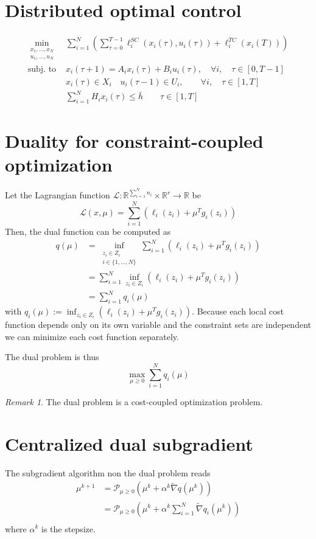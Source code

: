 \documentclass{book}
\newcommand{\R}{\mathbb{R}}
\theoremstyle{theoremv2}
\theoremstyle{defv2}
\theoremstyle{remark}
\newtheorem*{remark}{Remark}
\theoremstyle{remark}
\theoremstyle{definition}
\theoremstyle{definition}
\begin{document}
\section{Distributed optimal control}
\begin{align*}
    \min_{\substack{x_1,\dots,x_N\\u_1,\dots,u_N}} & \displaystyle\sum_{i=1}^{N} \left( \displaystyle\sum_{\tau=0}^{T-1}\ell_i^{SC}(x_i(\tau),u_i(\tau)) + \ell_i^{TC}(x_i(T)) \right)\\
    \text{subj. to } & x_i(\tau+1) = A_ix_i(\tau)+B_iu_i(\tau), \quad \forall i, \quad \tau\in [0,T-1]\\
                     & x_i(\tau) \in X_i \quad u_i(\tau-1)\in U_i, \qquad \forall i, \quad \tau\in [1,T]\\ 
                     & \displaystyle\sum_{i=1}^{N}H_ix_i(\tau)\leq \bar{h} \qquad \tau\in[1,T]
\end{align*}



\section{Duality for constraint-coupled optimization}
Let the Lagrangian function $\mathcal{L}:\R^{\sum_{i=1}^{N}n_i}\times \R^r \to \R$ be 
\[
    \mathcal{L} (x,\mu) = \displaystyle\sum_{i=1}^{N} (\ell_i(z_i)+\mu^T g_i(z_i))
\]
Then, the dual function can be computed as 
\begin{align*}
    q(\mu) & = \inf_{\substack{z_i\in Z_i \\ i\in\{1,\dots,N\}}}\displaystyle\sum_{i=1}^{N} \left(\ell_i(z_i) + \mu^Tg_i(z_i)\right) \\
           & = \displaystyle\sum_{i=1}^{N} \inf_{z_i\in Z_i} \left( \ell_i(z_i) + \mu^Tg_i(z_i)\right) \\
           & = \displaystyle\sum_{i=1}^{N} q_i(\mu)
\end{align*}
with $q_i(\mu) := \inf_{z_i\in Z_i} \left( \ell_i (z_i) + \mu^Tg_i(z_i)\right)$. Because each local cost function depends only on its own variable and the constraint sets are independent we can minimize each cost function separately.

The dual problem is thus 
\[
    \max_{\mu\geq 0} \displaystyle\sum_{i=1}^{N}q_i(\mu)
\]
\begin{remark}
    The dual problem is a cost-coupled optimization problem.
\end{remark}

\section{Centralized dual subgradient}
The subgradient algorithm non the dual problem reads 
\begin{align*}
    \mu^{k+1} &= \mathcal{P}_{\mu\geq 0}\left(\mu^k + \alpha^k\tilde{\nabla} q(\mu^k)\right)\\ 
              &= \mathcal{P}_{\mu\geq 0}\left(\mu^k + \alpha^k \displaystyle\sum_{i=1}^{N} \tilde{\nabla} q_i(\mu^k)\right)\\ 
\end{align*}
where $\alpha^k$ is the stepsize.
\end{document}
